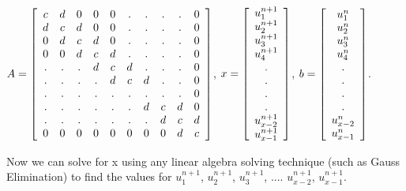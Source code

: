 \documentclass[11pt]{article}
\begin{document}
$A = 
\left[ {\begin{array}{*{20}c}
   c & d & 0 & 0 & 0 & . & . & . & . & 0  \\
   d & c & d & 0 & 0 & . & . & . & . & 0  \\
   0 & d & c & d & 0 & . & . & . & . & 0  \\
   0 & 0 & d & c & d & . & . & . & . & 0  \\
   . & . & . & d & c & d & . & . & . & 0  \\
   . & . & . & . & d & c & d & . & . & 0  \\
   . & . & . & . & . & . & . & . & . & 0  \\
   . & . & . & . & . & . & d & c & d & 0  \\
   . & . & . & . & . & . & . & d & c & d  \\
   0 & 0 & 0 & 0 & 0 & 0 & 0 & 0 & d & c  \\
 \end{array} } \right]
$, $x = 
\left[ {\begin{array}{*{20}c}
   u^{n+1}_{1} \\
   u^{n+1}_{2} \\
   u^{n+1}_{3} \\
   u^{n+1}_{4} \\
   . \\
   . \\
   . \\
   . \\
   u^{n+1}_{x-2} \\
   u^{n+1}_{x-1} \\
 \end{array} } \right]
$, $b = 
\left[ {\begin{array}{*{20}c}
   u^{n}_{1} \\
   u^{n}_{2} \\
   u^{n}_{3} \\
   u^{n}_{4} \\
   . \\
   . \\
   . \\
   . \\
   u^{n}_{x-2} \\
   u^{n}_{x-1} \\
 \end{array} } \right]
$.

Now we can solve for x using any linear algebra solving technique (such as Gauss Elimination) to find the values for $u^{n+1}_{1}$, $u^{n+1}_{2}$, $u^{n+1}_{3}$, .... $u^{n+1}_{x-2}$, $u^{n+1}_{x-1}$.
\end{document}
